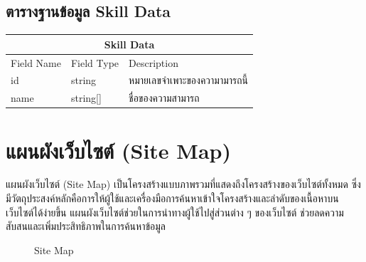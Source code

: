 \subsection{ตารางฐานข้อมูล Skill Data}
\begin{table}[H]
    \begin{tabularx}{\textwidth}{|l|l|X|}
        \hline
        \multicolumn{3}{|c|}{Skill Data}                              \\\hline
        Field Name    & Field Type & Description                  \\\hline
        id    & string     & หมายเลขจำเพาะของความามารถนี้       \\
        name  & string[]   & ชื่อของความสามารถ \\ \hline
    \end{tabularx}
\end{table}


\section{แผนผังเว็บไซต์ (Site Map)}
แผนผังเว็บไซต์ (Site Map) เป็นโครงสร้างแบบภาพรวมที่แสดงถึงโครงสร้างของเว็บไซต์ทั้งหมด ซึ่งมีวัตถุประสงค์หลักคือการให้ผู้ใช้และเครื่องมือการค้นหาเข้าใจโครงสร้างและลำดับของเนื้อหาบนเว็บไซต์ได้ง่ายขึ้น แผนผังเว็บไซต์ช่วยในการนำทางผู้ใช้ไปสู่ส่วนต่าง ๆ ของเว็บไซต์ ช่วยลดความสับสนและเพิ่มประสิทธิภาพในการค้นหาข้อมูล

\begin{figure}[H]\centering
    \setlength{\fboxrule}{0.2mm} %
    \setlength{\fboxsep}{0.5cm}
    \caption{Site Map}\label{fig:siteMap}
\end{figure}

